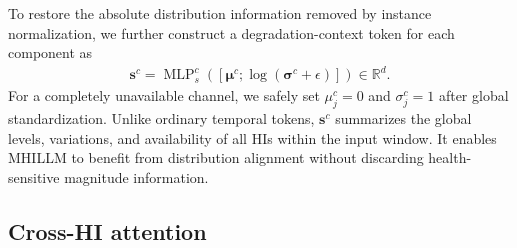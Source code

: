 \documentclass[preprint,12pt]{elsarticle}
\begin{document}
To restore the absolute distribution information removed by instance normalization, we further construct a degradation-context token for each component as
\begin{gather}
\mathbf{s}^{c}=\operatorname{MLP}_{s}^{c}\left([\boldsymbol{\mu}^{c};\log(\boldsymbol{\sigma}^{c}+\epsilon)]\right)\in\mathbb{R}^{d}.
\end{gather}
For a completely unavailable channel, we safely set $\mu_j^c=0$ and $\sigma_j^c=1$ after global standardization. Unlike ordinary temporal tokens, $\mathbf{s}^{c}$ summarizes the global levels, variations, and availability of all HIs within the input window. It enables MHILLM to benefit from distribution alignment without discarding health-sensitive magnitude information.

\subsection{Cross-HI attention}
\end{document}
